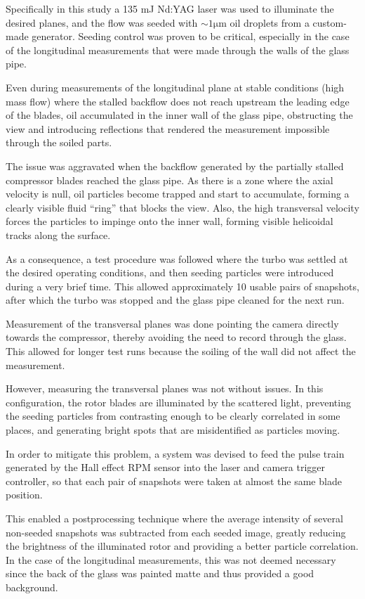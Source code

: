 Specifically in this study a 135 mJ Nd:YAG laser was used to illuminate the desired planes, and the flow was seeded with $\sim 1\mathrm{\mu m}$ oil droplets from a custom-made generator. Seeding control was proven to be critical, especially in the case of the longitudinal measurements that were made through the walls of the glass pipe.

Even during measurements of the longitudinal plane at stable conditions (high mass flow) where the stalled backflow does not reach upstream the leading edge of the blades, oil accumulated in the inner wall of the glass pipe, obstructing the view and introducing reflections that rendered the measurement impossible through the soiled parts.

The issue was aggravated when the backflow generated by the partially stalled compressor blades reached the glass pipe. As there is a zone where the axial velocity is null, oil particles become trapped and start to accumulate, forming a clearly visible fluid ``ring'' that blocks the view. Also, the high transversal velocity forces the particles to impinge onto the inner wall, forming visible helicoidal tracks along the surface.

As a consequence, a test procedure was followed where the turbo was settled at the desired operating conditions, and then seeding particles were introduced during a very brief time. This allowed approximately 10 usable pairs of snapshots, after which the turbo was stopped and the glass pipe cleaned for the next run.

Measurement of the transversal planes was done pointing the camera directly towards the compressor, thereby avoiding the need to record through the glass. This allowed for longer test runs because the soiling of the wall did not affect the measurement. 

However, measuring the transversal planes was not without issues. In this configuration, the rotor blades are illuminated by the scattered light, preventing the seeding particles from contrasting enough to be clearly correlated in some places, and generating bright spots that are misidentified as particles moving.

In order to mitigate this problem, a system was devised to feed the pulse train generated by the Hall effect RPM sensor into the laser and camera trigger controller, so that each pair of snapshots were taken at almost the same blade position.

This enabled a postprocessing technique where the average intensity of several non-seeded snapshots was subtracted from each seeded image, greatly reducing the brightness of the illuminated rotor and providing a better particle correlation. In the case of the longitudinal measurements, this was not deemed necessary since the back of the glass was painted matte and thus provided a good background.


